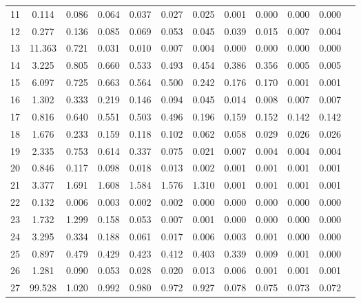 \begin{table}[!h]
{\begin{tabular}{|c|cccccccccc|c|}
11 & 0.114 & 0.086 & 0.064 & 0.037 & 0.027 & 0.025 & 0.001 & 0.000 & 0.000 & 0.000 \\
12 & 0.277 & 0.136 & 0.085 & 0.069 & 0.053 & 0.045 & 0.039 & 0.015 & 0.007 & 0.004 \\
13 & 11.363 & 0.721 & 0.031 & 0.010 & 0.007 & 0.004 & 0.000 & 0.000 & 0.000 & 0.000 \\
14 & 3.225 & 0.805 & 0.660 & 0.533 & 0.493 & 0.454 & 0.386 & 0.356 & 0.005 & 0.005 \\
15 & 6.097 & 0.725 & 0.663 & 0.564 & 0.500 & 0.242 & 0.176 & 0.170 & 0.001 & 0.001 \\
16 & 1.302 & 0.333 & 0.219 & 0.146 & 0.094 & 0.045 & 0.014 & 0.008 & 0.007 & 0.007 \\
17 & 0.816 & 0.640 & 0.551 & 0.503 & 0.496 & 0.196 & 0.159 & 0.152 & 0.142 & 0.142 \\
18 & 1.676 & 0.233 & 0.159 & 0.118 & 0.102 & 0.062 & 0.058 & 0.029 & 0.026 & 0.026 \\
19 & 2.335 & 0.753 & 0.614 & 0.337 & 0.075 & 0.021 & 0.007 & 0.004 & 0.004 & 0.004 \\
20 & 0.846 & 0.117 & 0.098 & 0.018 & 0.013 & 0.002 & 0.001 & 0.001 & 0.001 & 0.001 \\
21 & 3.377 & 1.691 & 1.608 & 1.584 & 1.576 & 1.310 & 0.001 & 0.001 & 0.001 & 0.001 \\
22 & 0.132 & 0.006 & 0.003 & 0.002 & 0.002 & 0.000 & 0.000 & 0.000 & 0.000 & 0.000 \\
23 & 1.732 & 1.299 & 0.158 & 0.053 & 0.007 & 0.001 & 0.000 & 0.000 & 0.000 & 0.000 \\
24 & 3.295 & 0.334 & 0.188 & 0.061 & 0.017 & 0.006 & 0.003 & 0.001 & 0.000 & 0.000 \\
25 & 0.897 & 0.479 & 0.429 & 0.423 & 0.412 & 0.403 & 0.339 & 0.009 & 0.001 & 0.000 \\
26 & 1.281 & 0.090 & 0.053 & 0.028 & 0.020 & 0.013 & 0.006 & 0.001 & 0.001 & 0.001 \\
27 & 99.528 & 1.020 & 0.992 & 0.980 & 0.972 & 0.927 & 0.078 & 0.075 & 0.073 & 0.072 \\
\hline
\end{tabular}
}
\end{table}



